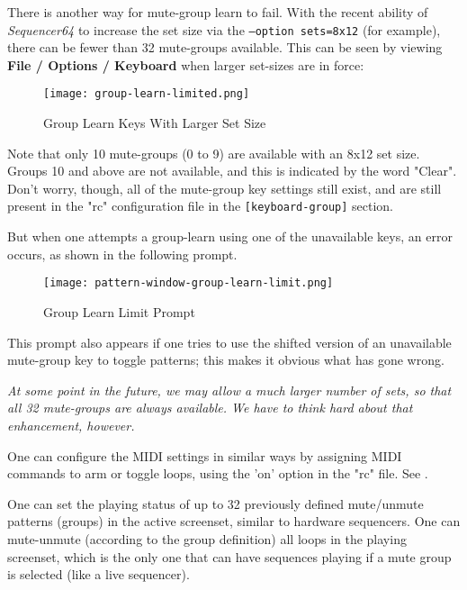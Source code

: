    There is another way for mute-group learn to fail.
   With the recent ability of \textsl{Sequencer64} to increase the set size via
   the \texttt{--option sets=8x12} (for example), there can be fewer than 32
   mute-groups available.   This can be seen by viewing
   \textbf{File / Options / Keyboard} when larger set-sizes are in force:

\begin{figure}[H]
   \centering 
   \texttt{[image: group-learn-limited.png]}
   \caption{Group Learn Keys With Larger Set Size}
   \label{fig:pattern_window_group_learn_limited}
\end{figure}

   Note that only 10 mute-groups (0 to 9) are available with an 8x12 set size.
   Groups 10 and above are not available, and this is indicated by the word
   "Clear".  Don't worry, though, all of the mute-group key settings still
   exist, and are still present in the "rc" configuration file in the
   \texttt{[keyboard-group]} section.

   But when one attempts a group-learn using one of the unavailable keys,
   an error occurs, as shown in the following prompt.

\begin{figure}[H]
   \centering 
   \texttt{[image: pattern-window-group-learn-limit.png]}
   \caption{Group Learn Limit Prompt}
   \label{fig:pattern_window_group_learn_limit}
\end{figure}

   This prompt also appears if one tries to use the shifted version of an
   unavailable mute-group key to toggle patterns; this makes it obvious what
   has gone wrong.

   \textsl{
   At some point in the future, we may allow a much larger number of sets, so
   that all 32 mute-groups are always available.  We have to think hard about
   that enhancement, however.
   }

   One can configure the MIDI settings in similar ways
   by assigning MIDI commands to arm or toggle loops, using 
   the 'on' option in the "rc" file.
   See .

   One can set the playing status of up to 32 previously
   defined mute/unmute patterns (groups) in the active screenset, similar to
   hardware sequencers.  One can mute-unmute (according to the group
   definition) all loops in the playing screenset, which is the only one that
   can have sequences playing if a mute group is selected
   (like a live sequencer).

